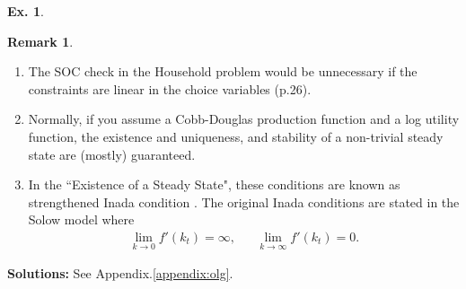 \documentclass[11pt,a4paper]{book}
\theoremstyle{definition}\newtheorem{definition}{Definition}
\theoremstyle{definition}\newtheorem{fact}{Fact}
\theoremstyle{definition}\newtheorem{remark}{Remark}
\theoremstyle{definition}\newtheorem{ex}{Ex.}
\theoremstyle{definition}\newtheorem{project}{Project}
\theoremstyle{definition}\newtheorem{problem}{Problem}
\theoremstyle{definition}\newtheorem{example}{Example}
\numberwithin{theorem}{section}
\numberwithin{corollary}{chapter}
\numberwithin{assumption}{chapter}
\numberwithin{definition}{chapter}
\numberwithin{prop}{chapter}
\numberwithin{notation}{chapter}
\numberwithin{problem}{chapter}
\numberwithin{example}{chapter}
\numberwithin{fact}{chapter}
\numberwithin{ex}{chapter}
\begin{document}
\begin{ex}
		\begin{remark}
			\begin{enumerate}
				\item The SOC check in the Household problem would be unnecessary if the constraints are linear in the choice variables \citep{de2012fertility} (p.26).
				\item Normally, if you assume a Cobb-Douglas production function and a log utility function, the existence and uniqueness, and stability of a non-trivial steady state are (mostly) guaranteed.
				\item In the ``Existence of a Steady State", these conditions are known as strengthened Inada condition \citep{galor1989existence}. The original Inada conditions are stated in the Solow model where
				\begin{align*}
					\lim_{k\to 0} f'(k_t) = \infty, && \lim_{k\to\infty} f'(k_t) = 0.
				\end{align*}
			\end{enumerate}
		\end{remark}
		
	\textbf{Solutions:} See Appendix.\ref{appendix:olg}. 	
	\end{ex}
	
\end{document}
